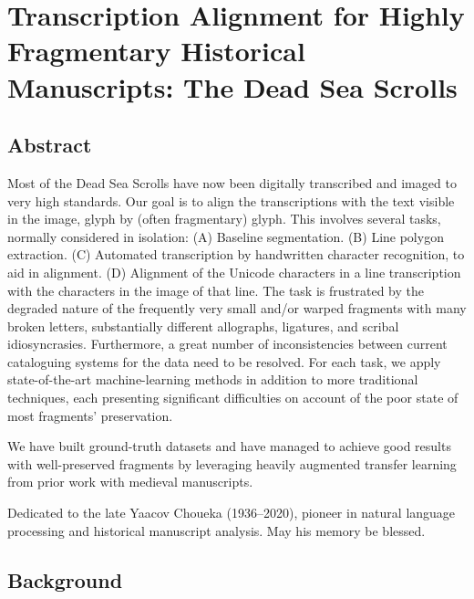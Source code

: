\chapter{Transcription Alignment for Highly Fragmentary Historical Manuscripts: The Dead Sea Scrolls}

\section{Abstract}
Most of the Dead Sea Scrolls have now been digitally transcribed and imaged to
very high standards. Our goal is to align the transcriptions with the text
visible in the image, glyph by (often fragmentary) glyph. 
This involves several tasks, normally considered in isolation: 
(A) Baseline segmentation.  
(B) Line polygon extraction.  (C) Automated transcription by handwritten
character recognition, to aid in alignment.  (D) Alignment of the Unicode
characters in a line transcription with the characters in the image of that
line.  The task is frustrated by the degraded nature of the frequently very
small and/or warped fragments with many broken letters, substantially different
allographs, ligatures, and scribal idiosyncrasies.  Furthermore, a great number
of inconsistencies between current cataloguing systems for the data need to be
resolved.  For each task, we apply state-of-the-art machine-learning methods in
addition to more traditional techniques, each presenting significant
difficulties on account of the poor state of most fragments' preservation.   

We have built ground-truth datasets and have managed to achieve good results
with well-preserved fragments by leveraging heavily augmented transfer learning
from prior work with medieval manuscripts.

\epigraph{Dedicated to the late Yaacov Choueka (1936--2020), pioneer in
natural language processing and historical manuscript analysis. May his memory
be blessed.}{}
\section{Background}


